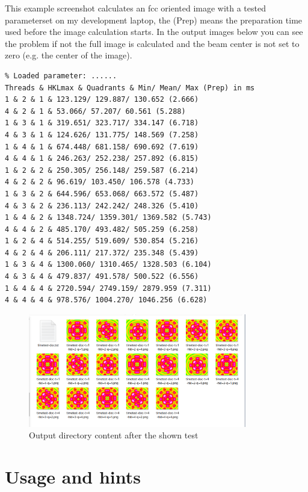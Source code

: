 \documentclass[11pt]{article} %
\begin{document}
This example screenshot calculates an fcc oriented image with a tested parameterset on my development laptop, the (Prep) means the preparation time used before the image calculation starts. In the output images below you can see the problem if not the full image is calculated and the beam center is not set to zero (e.g. the center of the image).

\begin{lstlisting}[frame=single, xleftmargin=1cm, xrightmargin=1cm]
% FCC oriented test
% Loaded parameter: ......
Threads & HKLmax & Quadrants & Min/ Mean/ Max (Prep) in ms
1 & 2 & 1 & 123.129/ 129.887/ 130.652 (2.666)
4 & 2 & 1 & 53.066/ 57.207/ 60.561 (5.288)
1 & 3 & 1 & 319.651/ 323.717/ 334.147 (6.718)
4 & 3 & 1 & 124.626/ 131.775/ 148.569 (7.258)
1 & 4 & 1 & 674.448/ 681.158/ 690.692 (7.619)
4 & 4 & 1 & 246.263/ 252.238/ 257.892 (6.815)
1 & 2 & 2 & 250.305/ 256.148/ 259.587 (6.214)
4 & 2 & 2 & 96.619/ 103.450/ 106.578 (4.733)
1 & 3 & 2 & 644.596/ 653.068/ 663.572 (5.487)
4 & 3 & 2 & 236.113/ 242.242/ 248.326 (5.410)
1 & 4 & 2 & 1348.724/ 1359.301/ 1369.582 (5.743)
4 & 4 & 2 & 485.170/ 493.482/ 505.259 (6.258)
1 & 2 & 4 & 514.255/ 519.609/ 530.854 (5.216)
4 & 2 & 4 & 206.111/ 217.372/ 235.348 (5.439)
1 & 3 & 4 & 1300.060/ 1310.465/ 1328.503 (6.104)
4 & 3 & 4 & 479.837/ 491.578/ 500.522 (6.556)
1 & 4 & 4 & 2720.594/ 2749.159/ 2879.959 (7.311)
4 & 4 & 4 & 978.576/ 1004.270/ 1046.256 (6.628)
\end{lstlisting}
\begin{figure}[H]
 \centering
 \includegraphics[width=0.85\textwidth]{timing_test_out.png}
 \caption{Output directory content after the shown test}
 \label{fig:imagemeta}
\end{figure}



\clearpage
\section{Usage and hints}
\end{document}
